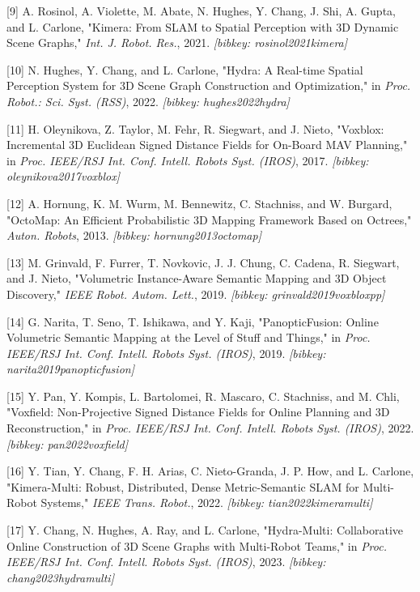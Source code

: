\documentclass[
]{article}
\begin{document}
{[}9{]} A. Rosinol, A. Violette, M. Abate, N. Hughes, Y. Chang, J. Shi,
A. Gupta, and L. Carlone, "Kimera: From SLAM to Spatial Perception with
3D Dynamic Scene Graphs," \emph{Int. J. Robot. Res.}, 2021.
\emph{{[}bibkey: rosinol2021kimera{]}}

{[}10{]} N. Hughes, Y. Chang, and L. Carlone, "Hydra: A Real-time
Spatial Perception System for 3D Scene Graph Construction and
Optimization," in \emph{Proc. Robot.: Sci. Syst. (RSS)}, 2022.
\emph{{[}bibkey: hughes2022hydra{]}}

{[}11{]} H. Oleynikova, Z. Taylor, M. Fehr, R. Siegwart, and J. Nieto,
"Voxblox: Incremental 3D Euclidean Signed Distance Fields for On-Board
MAV Planning," in \emph{Proc. IEEE/RSJ Int. Conf. Intell. Robots Syst.
(IROS)}, 2017. \emph{{[}bibkey: oleynikova2017voxblox{]}}

{[}12{]} A. Hornung, K. M. Wurm, M. Bennewitz, C. Stachniss, and W.
Burgard, "OctoMap: An Efficient Probabilistic 3D Mapping Framework Based
on Octrees," \emph{Auton. Robots}, 2013. \emph{{[}bibkey:
hornung2013octomap{]}}

{[}13{]} M. Grinvald, F. Furrer, T. Novkovic, J. J. Chung, C. Cadena, R.
Siegwart, and J. Nieto, "Volumetric Instance-Aware Semantic Mapping and
3D Object Discovery," \emph{IEEE Robot. Autom. Lett.}, 2019.
\emph{{[}bibkey: grinvald2019voxbloxpp{]}}

{[}14{]} G. Narita, T. Seno, T. Ishikawa, and Y. Kaji, "PanopticFusion:
Online Volumetric Semantic Mapping at the Level of Stuff and Things," in
\emph{Proc. IEEE/RSJ Int. Conf. Intell. Robots Syst. (IROS)}, 2019.
\emph{{[}bibkey: narita2019panopticfusion{]}}

{[}15{]} Y. Pan, Y. Kompis, L. Bartolomei, R. Mascaro, C. Stachniss, and
M. Chli, "Voxfield: Non-Projective Signed Distance Fields for Online
Planning and 3D Reconstruction," in \emph{Proc. IEEE/RSJ Int. Conf.
Intell. Robots Syst. (IROS)}, 2022. \emph{{[}bibkey: pan2022voxfield{]}}

{[}16{]} Y. Tian, Y. Chang, F. H. Arias, C. Nieto-Granda, J. P. How, and
L. Carlone, "Kimera-Multi: Robust, Distributed, Dense Metric-Semantic
SLAM for Multi-Robot Systems," \emph{IEEE Trans. Robot.}, 2022.
\emph{{[}bibkey: tian2022kimeramulti{]}}

{[}17{]} Y. Chang, N. Hughes, A. Ray, and L. Carlone, "Hydra-Multi:
Collaborative Online Construction of 3D Scene Graphs with Multi-Robot
Teams," in \emph{Proc. IEEE/RSJ Int. Conf. Intell. Robots Syst. (IROS)},
2023. \emph{{[}bibkey: chang2023hydramulti{]}}
\end{document}
